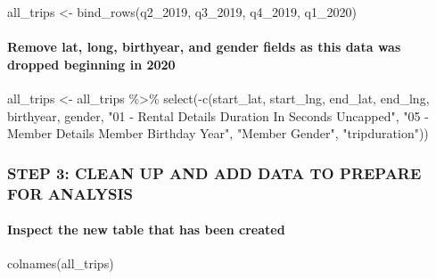 \documentclass[
]{article}
\newenvironment{Shaded}{\begin{snugshade}}{\end{snugshade}}
\newcommand{\FunctionTok}[1]{\textcolor[rgb]{0.00,0.00,0.00}{#1}}
\newcommand{\NormalTok}[1]{#1}
\newcommand{\OtherTok}[1]{\textcolor[rgb]{0.56,0.35,0.01}{#1}}
\newcommand{\SpecialCharTok}[1]{\textcolor[rgb]{0.00,0.00,0.00}{#1}}
\newcommand{\StringTok}[1]{\textcolor[rgb]{0.31,0.60,0.02}{#1}}
\begin{document}
\begin{Shaded}
\begin{Highlighting}[]
\NormalTok{all\_trips }\OtherTok{\textless{}{-}} \FunctionTok{bind\_rows}\NormalTok{(q2\_2019, q3\_2019, q4\_2019, q1\_2020)}
\end{Highlighting}
\end{Shaded}

\hypertarget{remove-lat-long-birthyear-and-gender-fields-as-this-data-was-dropped-beginning-in-2020}{%
\paragraph{Remove lat, long, birthyear, and gender fields as this data
was dropped beginning in
2020}\label{remove-lat-long-birthyear-and-gender-fields-as-this-data-was-dropped-beginning-in-2020}}

\begin{Shaded}
\begin{Highlighting}[]
\NormalTok{all\_trips }\OtherTok{\textless{}{-}}\NormalTok{ all\_trips }\SpecialCharTok{\%\textgreater{}\%}  
  \FunctionTok{select}\NormalTok{(}\SpecialCharTok{{-}}\FunctionTok{c}\NormalTok{(start\_lat, start\_lng, end\_lat, end\_lng, }
\NormalTok{            birthyear, gender, }
            \StringTok{"01 {-} Rental Details Duration In Seconds Uncapped"}\NormalTok{, }
            \StringTok{"05 {-} Member Details Member Birthday Year"}\NormalTok{, }
            \StringTok{"Member Gender"}\NormalTok{, }\StringTok{"tripduration"}\NormalTok{))}
\end{Highlighting}
\end{Shaded}

\hypertarget{step-3-clean-up-and-add-data-to-prepare-for-analysis}{%
\subsubsection{STEP 3: CLEAN UP AND ADD DATA TO PREPARE FOR
ANALYSIS}\label{step-3-clean-up-and-add-data-to-prepare-for-analysis}}

\hypertarget{inspect-the-new-table-that-has-been-created}{%
\paragraph{Inspect the new table that has been
created}\label{inspect-the-new-table-that-has-been-created}}

\begin{Shaded}
\begin{Highlighting}[]
\FunctionTok{colnames}\NormalTok{(all\_trips)}
\end{Highlighting}
\end{Shaded}
\end{document}

